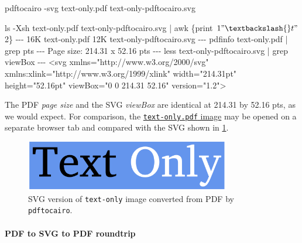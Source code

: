 \documentclass[
  11pt,
  british,
  a4paper,
]{article}
\newenvironment{Shaded}{\begin{snugshade}}{\end{snugshade}}
\newcommand{\AttributeTok}[1]{\textcolor[rgb]{0.80,0.80,0.80}{#1}}
\newcommand{\ExtensionTok}[1]{\textcolor[rgb]{0.80,0.80,0.80}{#1}}
\newcommand{\FunctionTok}[1]{\textcolor[rgb]{0.94,0.94,0.56}{#1}}
\newcommand{\KeywordTok}[1]{\textcolor[rgb]{0.94,0.87,0.69}{#1}}
\newcommand{\NormalTok}[1]{\textcolor[rgb]{0.80,0.80,0.80}{#1}}
\newcommand{\OperatorTok}[1]{\textcolor[rgb]{0.94,0.94,0.82}{#1}}
\newcommand{\StringTok}[1]{\textcolor[rgb]{0.80,0.58,0.58}{#1}}
\newcommand{\VariableTok}[1]{\textcolor[rgb]{0.80,0.80,0.80}{#1}}
\begin{document}
\begin{Shaded}
\begin{Highlighting}[]
\ExtensionTok{pdftocairo} \AttributeTok{{-}svg}\NormalTok{ text{-}only.pdf text{-}only{-}pdftocairo.svg}

\FunctionTok{ls} \AttributeTok{{-}Xsh}\NormalTok{ text{-}only.pdf text{-}only{-}pdftocairo.svg }\KeywordTok{|} \FunctionTok{awk} \StringTok{\textquotesingle{}\{print $1 "\textbackslash{}t" $2\}\textquotesingle{}}
\ExtensionTok{{-}{-}{-}}
\ExtensionTok{16K}\NormalTok{     text{-}only.pdf}
\ExtensionTok{12K}\NormalTok{     text{-}only{-}pdftocairo.svg}
\ExtensionTok{{-}{-}{-}}
\ExtensionTok{pdfinfo}\NormalTok{ text{-}only.pdf }\KeywordTok{|} \FunctionTok{grep}\NormalTok{ pts}
\ExtensionTok{{-}{-}{-}}
\ExtensionTok{Page}\NormalTok{ size:      214.31 x 52.16 pts}
\ExtensionTok{{-}{-}{-}}
\FunctionTok{less}\NormalTok{ text{-}only{-}pdftocairo.svg }\KeywordTok{|} \FunctionTok{grep}\NormalTok{ viewBox}
\ExtensionTok{{-}{-}{-}}
\OperatorTok{\textless{}}\NormalTok{svg }\VariableTok{xmlns}\OperatorTok{=}\StringTok{"http://www.w3.org/2000/svg"} \ExtensionTok{xmlns:xlink=}\StringTok{"http://www.w3.org/1999/xlink"}\NormalTok{ width=}\StringTok{"214.31pt"}\NormalTok{ height=}\StringTok{"52.16pt"}\NormalTok{ viewBox=}\StringTok{"0 0 214.31 52.16"}\NormalTok{ version=}\StringTok{"1.2"}\OperatorTok{\textgreater{}}
\end{Highlighting}
\end{Shaded}

The PDF \emph{page size} and the SVG \emph{viewBox} are identical at
214.31 by 52.16 pts, as we would expect. For comparison, the
\href{images/text-only.pdf}{\texttt{text-only.pdf} image} may be opened
on a separate browser tab and compared with the SVG shown in
\cref{fig:SVGfromPDFviapdftocairo}.

\begin{figure}
\hypertarget{fig:SVGfromPDFviapdftocairo}{%
\centering
\includegraphics[width=0.8\textwidth,height=\textheight]{images/text-only-pdftocairo.svg}
\caption{SVG version of \texttt{text-only} image converted from PDF by
\texttt{pdftocairo}.}\label{fig:SVGfromPDFviapdftocairo}
}
\end{figure}

\hypertarget{pdf-to-svg-to-pdf-roundtrip}{%
\paragraph{PDF to SVG to PDF
roundtrip}\label{pdf-to-svg-to-pdf-roundtrip}}
\end{document}
